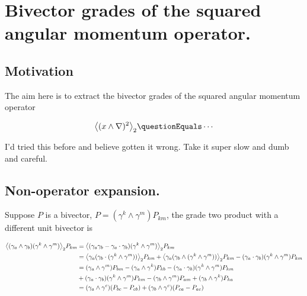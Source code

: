 

\chapter{Bivector grades of the squared angular momentum operator.}
\label{chap:bivectorSelect}
{}
\date{Sept 6, 2009}

\beginArtNoToc

\section{Motivation}

The aim here is to extract the bivector grades of the squared angular momentum operator

\begin{align}\label{eqn:bivectorSelect:goo1}
\gpgradetwo{ (x \wedge \grad)^2 } \questionEquals \cdots
\end{align}

I'd tried this before and believe gotten it wrong.  Take it super slow and dumb and careful.

\section{Non-operator expansion.}

Suppose $P$ is a bivector, $P = (\gamma^k \wedge \gamma^m) P_{km}$, the grade two product with a different unit bivector is

\begin{align*}
{\left\langle{{ (\gamma_a \wedge \gamma_b) (\gamma^k \wedge \gamma^m) }}\right\rangle}_{2} P_{km} 
&= 
{\left\langle{{ (\gamma_a \gamma_b - \gamma_a \cdot \gamma_b) (\gamma^k \wedge \gamma^m) }}\right\rangle}_{2} P_{km} \\
&= 
{\left\langle{{ \gamma_a (\gamma_b \cdot (\gamma^k \wedge \gamma^m)) }}\right\rangle}_{2} P_{km} 
+ {\left\langle{{ \gamma_a (\gamma_b \wedge (\gamma^k \wedge \gamma^m)) }}\right\rangle}_{2} P_{km} 
- (\gamma_a \cdot \gamma_b) (\gamma^k \wedge \gamma^m) P_{km} \\
&= 
(\gamma_a \wedge \gamma^m) P_{b m} -(\gamma_a \wedge \gamma^k) P_{k b} - (\gamma_a \cdot \gamma_b) (\gamma^k \wedge \gamma^m) P_{km} \\
&+ (\gamma_a \cdot \gamma_b) (\gamma^k \wedge \gamma^m) P_{km} 
- (\gamma_b \wedge \gamma^m) P_{a m} 
+ (\gamma_b \wedge \gamma^k) P_{k a} 
\\
&= 
(\gamma_a \wedge \gamma^c) (P_{b c} -P_{c b})
+ (\gamma_b \wedge \gamma^c) (P_{c a} -P_{a c} )
\\
\end{align*}

